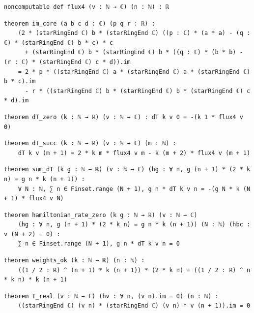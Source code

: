 \begin{lstlisting}[style=leancat]
noncomputable def flux4 (v : ℕ → ℂ) (n : ℕ) : ℝ
\end{lstlisting}

\begin{lstlisting}[style=leancat]
theorem im_core (a b c d : ℂ) (p q r : ℝ) :
    (2 * (starRingEnd ℂ) b * (starRingEnd ℂ) ((p : ℂ) * (a * a) - (q : ℂ) * (starRingEnd ℂ) b * c) * c
      + (starRingEnd ℂ) b * (starRingEnd ℂ) b * ((q : ℂ) * (b * b) - (r : ℂ) * (starRingEnd ℂ) c * d)).im
    = 2 * p * ((starRingEnd ℂ) a * (starRingEnd ℂ) a * (starRingEnd ℂ) b * c).im
      - r * ((starRingEnd ℂ) b * (starRingEnd ℂ) b * (starRingEnd ℂ) c * d).im
\end{lstlisting}

\begin{lstlisting}[style=leancat]
theorem dT_zero (k : ℕ → ℝ) (v : ℕ → ℂ) : dT k v 0 = -(k 1 * flux4 v 0)
\end{lstlisting}

\begin{lstlisting}[style=leancat]
theorem dT_succ (k : ℕ → ℝ) (v : ℕ → ℂ) (m : ℕ) :
    dT k v (m + 1) = 2 * k m * flux4 v m - k (m + 2) * flux4 v (m + 1)
\end{lstlisting}

\begin{lstlisting}[style=leancat]
theorem sum_dT (k g : ℕ → ℝ) (v : ℕ → ℂ) (hg : ∀ n, g (n + 1) * (2 * k n) = g n * k (n + 1)) :
    ∀ N : ℕ, ∑ n ∈ Finset.range (N + 1), g n * dT k v n = -(g N * k (N + 1) * flux4 v N)
\end{lstlisting}

\begin{lstlisting}[style=leancat]
theorem hamiltonian_rate_zero (k g : ℕ → ℝ) (v : ℕ → ℂ)
    (hg : ∀ n, g (n + 1) * (2 * k n) = g n * k (n + 1)) (N : ℕ) (hbc : v (N + 2) = 0) :
    ∑ n ∈ Finset.range (N + 1), g n * dT k v n = 0
\end{lstlisting}

\begin{lstlisting}[style=leancat]
theorem weights_ok (k : ℕ → ℝ) (n : ℕ) :
    ((1 / 2 : ℝ) ^ (n + 1) * k (n + 1)) * (2 * k n) = ((1 / 2 : ℝ) ^ n * k n) * k (n + 1)
\end{lstlisting}

\begin{lstlisting}[style=leancat]
theorem T_real (v : ℕ → ℂ) (hv : ∀ n, (v n).im = 0) (n : ℕ) :
    ((starRingEnd ℂ) (v n) * (starRingEnd ℂ) (v n) * v (n + 1)).im = 0
\end{lstlisting}

